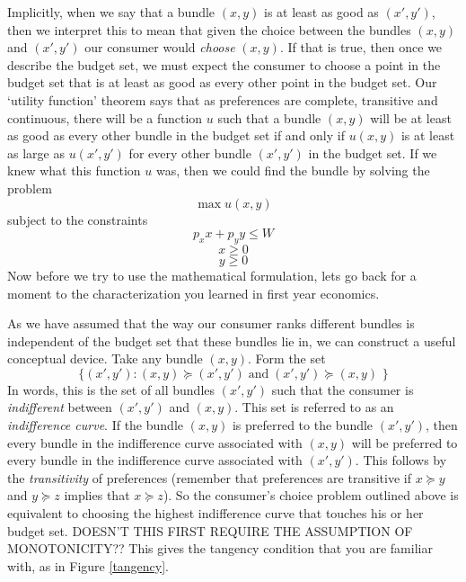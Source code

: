 \documentclass[12pt]{article}
\newcommand{\tmop}[1]{\operatorname{#1}}
\newcommand{\tmem}[1]{\textit{#1}}
\begin{document}
Implicitly, when we say that a bundle $( x, y )$ is at least as good as $( x',
y' )$, then we interpret this to mean that given the choice between the
bundles $\text{$( x, y )$}$ and $\text{$( x', y' )$}$ our consumer would
{\tmem{choose}} $\text{$( x, y )$}$. If that is true, then once we describe
the budget set, we must expect the consumer to choose a point in the budget
set that is at least as good as every other point in the budget set.  Our
`utility function' theorem says that as preferences are complete, transitive
and continuous, there will be a function $u$ such that a bundle $( x, y )$
will be at least as good as every other bundle in the budget set if and only
if $u ( x, y )$ is at least as large as $u ( x', y' )$ for every other bundle
$( x', y' )$ in the budget set. If we knew what this function $u$ was, then we
could find the bundle by solving the problem
\begin{equation}
  \max u ( x, y ) \label{objective}
\end{equation}
subject to the constraints
\begin{equation}
  p_x x + p_y y \leqslant W \label{budget-constraint}
\end{equation}
\begin{equation}
  x \geqslant 0 \label{x-positive}
\end{equation}
\begin{equation}
  y \geqslant 0 \label{y-positive}
\end{equation}
Now before we try to use the mathematical formulation, lets go back for a
moment to the characterization you learned in first year economics.

As we have assumed that the way our consumer ranks different bundles is
independent of the budget set that these bundles lie in, we can construct a
useful conceptual device. Take any bundle $( x, y )$. Form the set
\[ \{ \text{$( x', y' ) : \text{$( x, y ) \succeq \text{$( x', y' ) \tmop{and}
   \text{$( x', y' ) \succeq \text{$( x, y )$ \}}$}$}$}$} \]
In words, this is the set of all bundles $( x', y' )$ such that the consumer
is {\tmem{indifferent}} between $( x', y' )$ and $( x, y )$. This set is
referred to as an {\tmem{indifference curve}}. If the bundle $( x, y )$ is
preferred to the bundle $( x', y' )$, then every bundle in the indifference
curve associated with $( x, y )$ will be preferred to every bundle in the
indifference curve associated with $( x', y' )$. This follows by the
{\tmem{transitivity}} of preferences (remember that preferences are transitive
if $x \succeq y$ and $y \succeq z$ implies that $x \succeq z$). So the
consumer's choice problem outlined above is equivalent to choosing the highest
indifference curve that touches his or her budget set. DOESN'T THIS FIRST REQUIRE THE ASSUMPTION OF MONOTONICITY?? This gives the tangency
condition that you are familiar with, as in Figure \ref{tangency}.
\end{document}
